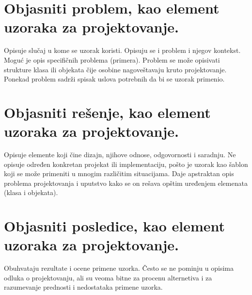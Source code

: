 \documentclass[a4paper]{article}
\begin{document}
\section{Objasniti problem, kao element uzoraka za projektovanje.}
  Opisuje slučaj u kome se uzorak koristi.
  Opisuju se i problem i njegov kontekst.
  Moguć je opis specifičnih problema (primera).
  Problem se može opisivati strukture klasa ili objekata čije osobine nagoveštavaju kruto 
  projektovanje. Ponekad problem sadrži spisak uslova potrebnih da bi se uzorak primenio.

\section{Objasniti rešenje, kao element uzoraka za projektovanje.}
  Opisuje elemente koji čine dizajn, njihove odnose, odgovornosti i saradnju.
  Ne opisuje određen konkretan projekat ili implementaciju, 
  pošto je uzorak kao šablon koji se može primeniti u mnogim različitim situacijama.
  Daje apstraktan opis problema projektovanja i uputstvo kako se on rešava opštim uređenjem 
  elemenata (klasa i objekata).

\section{Objasniti posledice, kao element uzoraka za projektovanje.}
  Obuhvataju rezultate i ocene primene uzorka.
  Često se ne pominju u opisima odluka o projektovanju, 
  ali su veoma bitne za procenu alternetiva i za razumevanje prednosti 
  i nedostataka primene uzorka.
\end{document}
